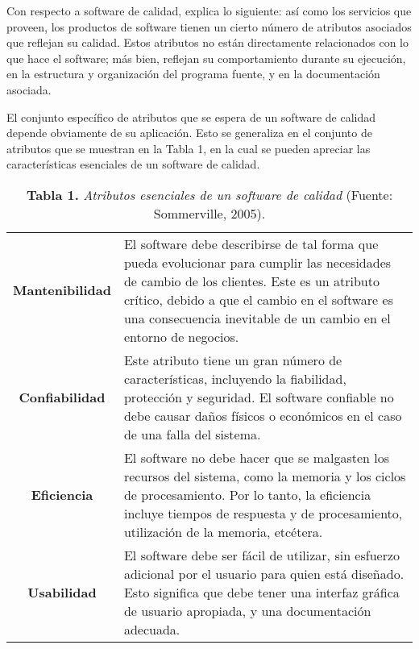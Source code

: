 	Con respecto a software de calidad, \cite{Sommerville} explica lo siguiente: as\'{i} como los servicios que proveen, los productos de software tienen un cierto n\'{u}mero de atributos asociados que reflejan su calidad. Estos atributos no est\'{a}n directamente relacionados con lo que hace el software; m\'{a}s bien, reflejan su comportamiento durante su ejecuci\'{o}n, en la estructura y organizaci\'{o}n del programa fuente, y en la documentaci\'{o}n asociada.

El conjunto espec\'{i}fico de atributos que se espera de un software de calidad depende obviamente de su aplicaci\'{o}n. Esto se generaliza en el conjunto de atributos que se muestran en la Tabla 1, en la cual se pueden apreciar las caracter\'{i}sticas esenciales de un software de calidad.

\FloatBarrier %
		\begin{table}[htb]
			\small
			\label{tabla_1}
			\centering
			\setlength{\extrarowheight}{3.5pt}
			\begin{tabulary}{15cm}{|c|J|}
				
				\hline
				 & \\ \hline
			\textbf{Mantenibilidad} & El software debe describirse de tal forma que pueda evolucionar  para cumplir las necesidades de cambio de los 					clientes. Este es un atributo cr\'{i}tico, debido a que el cambio en el software es una consecuencia inevitable de un cambio en el entorno de negocios.\\ \hline
			\textbf{Confiabilidad} & Este atributo tiene un gran n\'{u}mero de caracter\'{i}sticas, incluyendo la fiabilidad, protecci\'{o}n y seguridad. El software confiable no debe causar da\~{n}os f\'{i}sicos o econ\'{o}micos en el caso de una falla del sistema.\\ \hline
			\textbf{Eficiencia} & El software no debe hacer que se malgasten los recursos del sistema, como la memoria y los ciclos de procesamiento. Por lo tanto, la eficiencia incluye tiempos de respuesta y de procesamiento, utilizaci\'{o}n de la memoria, etc\'{e}tera.\\ \hline
			\textbf{Usabilidad} & El software debe ser f\'{a}cil de utilizar, sin esfuerzo adicional por el usuario para quien est\'{a} dise\~{n}ado. Esto significa que debe tener una interfaz gr\'{a}fica de usuario apropiada, y una documentaci\'{o}n adecuada.\\ \hline
			\end{tabulary}
			\caption{\textbf{Tabla 1.} \textit{Atributos esenciales de un software de calidad} (Fuente: Sommerville, 2005).}
		\end{table}
\FloatBarrier %

